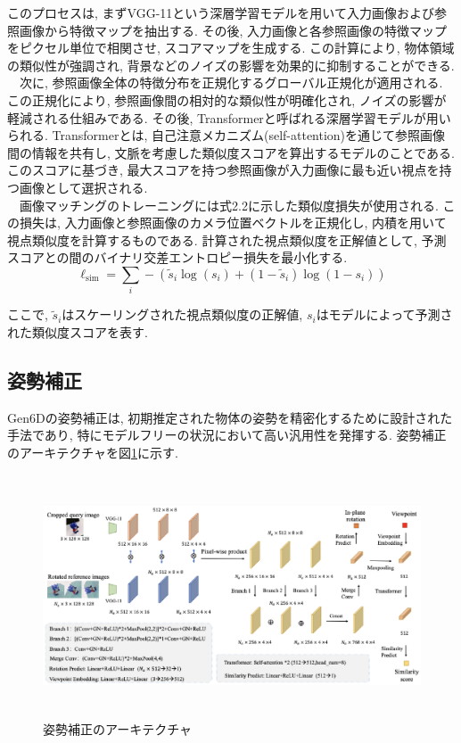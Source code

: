 このプロセスは, まずVGG-11という深層学習モデルを用いて入力画像および参照画像から特徴マップを抽出する. 
その後, 入力画像と各参照画像の特徴マップをピクセル単位で相関させ, スコアマップを生成する. 
この計算により, 物体領域の類似性が強調され, 背景などのノイズの影響を効果的に抑制することができる. \\
　次に, 参照画像全体の特徴分布を正規化するグローバル正規化が適用される. 
この正規化により, 参照画像間の相対的な類似性が明確化され, ノイズの影響が軽減される仕組みである. 
その後, Transformerと呼ばれる深層学習モデルが用いられる. 
Transformerとは, 自己注意メカニズム(self-attention)を通じて参照画像間の情報を共有し, 文脈を考慮した類似度スコアを算出するモデルのことである. 
このスコアに基づき, 最大スコアを持つ参照画像が入力画像に最も近い視点を持つ画像として選択される. \\
　画像マッチングのトレーニングには式2.2に示した類似度損失が使用される. 
この損失は, 入力画像と参照画像のカメラ位置ベクトルを正規化し, 内積を用いて視点類似度を計算するものである. 
計算された視点類似度を正解値として, 予測スコアとの間のバイナリ交差エントロピー損失を最小化する. 
\begin{equation}
	\ell_{\text{sim}} = \sum_{i} - \left( \tilde{s}_i \log(s_i) + (1 - \tilde{s}_i) \log(1 - s_i) \right)
	\tag{2.2}
\end{equation}
	
ここで, \(\tilde{s}_i\)はスケーリングされた視点類似度の正解値, \(s_i\)はモデルによって予測された類似度スコアを表す. 

\subsection{姿勢補正}
Gen6Dの姿勢補正は, 初期推定された物体の姿勢を精密化するために設計された手法であり, 特にモデルフリーの状況において高い汎用性を発揮する. 
姿勢補正のアーキテクチャを図\ref{fig:2-f6}に示す. 
\begin{figure}[htbt]
	\centering
	 \includegraphics[height=72mm]{Figure/selector_arc.eps}
	 \caption{姿勢補正のアーキテクチャ}
	 \label{fig:2-f6}
\end{figure}

